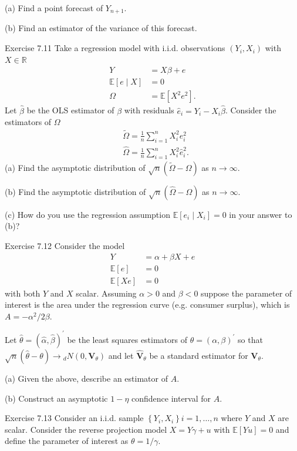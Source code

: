 \documentclass[10pt]{article}
\begin{document}
(a) Find a point forecast of $Y_{n+1}$.

(b) Find an estimator of the variance of this forecast.

Exercise 7.11 Take a regression model with i.i.d. observations $\left(Y_{i}, X_{i}\right)$ with $X \in \mathbb{R}$
$$
\begin{aligned}
Y &=X \beta+e \\
\mathbb{E}[e \mid X] &=0 \\
\Omega &=\mathbb{E}\left[X^{2} e^{2}\right] .
\end{aligned}
$$
Let $\widehat{\beta}$ be the OLS estimator of $\beta$ with residuals $\widehat{e}_{i}=Y_{i}-X_{i} \widehat{\beta}$. Consider the estimators of $\Omega$
$$
\begin{aligned}
&\widetilde{\Omega}=\frac{1}{n} \sum_{i=1}^{n} X_{i}^{2} e_{i}^{2} \\
&\widehat{\Omega}=\frac{1}{n} \sum_{i=1}^{n} X_{i}^{2} \widehat{e}_{i}^{2} .
\end{aligned}
$$
(a) Find the asymptotic distribution of $\sqrt{n}(\widetilde{\Omega}-\Omega)$ as $n \rightarrow \infty$.

(b) Find the asymptotic distribution of $\sqrt{n}(\widehat{\Omega}-\Omega)$ as $n \rightarrow \infty$.

(c) How do you use the regression assumption $\mathbb{E}\left[e_{i} \mid X_{i}\right]=0$ in your answer to (b)?

Exercise 7.12 Consider the model
$$
\begin{aligned}
Y &=\alpha+\beta X+e \\
\mathbb{E}[e] &=0 \\
\mathbb{E}[X e] &=0
\end{aligned}
$$
with both $Y$ and $X$ scalar. Assuming $\alpha>0$ and $\beta<0$ suppose the parameter of interest is the area under the regression curve (e.g. consumer surplus), which is $A=-\alpha^{2} / 2 \beta$.

Let $\widehat{\theta}=(\widehat{\alpha}, \widehat{\beta})^{\prime}$ be the least squares estimators of $\theta=(\alpha, \beta)^{\prime}$ so that $\sqrt{n}(\widehat{\theta}-\theta) \rightarrow{ }_{d} N\left(0, \boldsymbol{V}_{\theta}\right)$ and let $\widehat{\boldsymbol{V}}_{\theta}$ be a standard estimator for $\boldsymbol{V}_{\theta}$.

(a) Given the above, describe an estimator of $A$.

(b) Construct an asymptotic $1-\eta$ confidence interval for $A$.

Exercise 7.13 Consider an i.i.d. sample $\left\{Y_{i}, X_{i}\right\} i=1, \ldots, n$ where $Y$ and $X$ are scalar. Consider the reverse projection model $X=Y \gamma+u$ with $\mathbb{E}[Y u]=0$ and define the parameter of interest as $\theta=1 / \gamma$.
\end{document}
